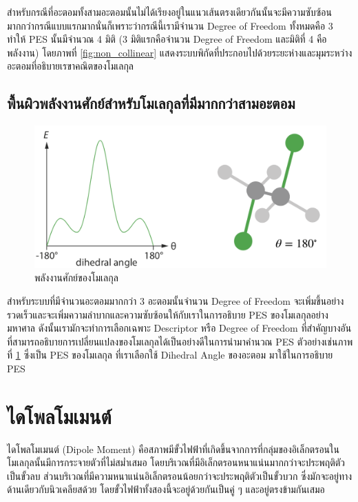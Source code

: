 สำหรับกรณีที่อะตอมทั้งสามอะตอมนั้นไม่ได้เรียงอยู่ในแนวเส้นตรงเดียวกันนั้นจะมีความซับซ้อนมากกว่ากรณีแบบแรกมากนั่นก็เพราะว่ากรณีนี้เรามีจำนวน Degree of Freedom ทั้งหมดคือ 3 ทำให้ PES นั้นมีจำนวณ 4 มิติ (3 มิติแรกคือจำนวน Degree of Freedom และมิติที่ 4 คือพลังงาน) โดยภาพที่ \ref{fig:non_collinear} แสดงระบบพิกัดที่ประกอบไปด้วยระยะห่างและมุมระหว่างอะตอมที่อธิบายเรขาคณิตของโมเลกุล

\subsection{พื้นผิวพลังงานศักย์สำหรับโมเลกุลที่มีมากกว่าสามอะตอม}
\label{ssec:pes_n_atoms}

\begin{figure}[H]
    \centering
    \includegraphics[width=0.7\linewidth]{fig/PES_C2H4Cl2.png}
    \caption{พลังงานศักย์ของโมเลกุล }
    \label{fig:pes_c2h4cl2}
\end{figure}

สำหรับระบบที่มีจำนวนอะตอมมากกว่า 3 อะตอมนั้นจำนวน Degree of Freedom จะเพิ่มขึ้นอย่างรวดเร็วและจะเพิ่มความลำบากและความซับซ้อนให้กับเราในการอธิบาย PES ของโมเลกุลอย่างมหาศาล ดังนั้นเรามักจะทำการเลือกเฉพาะ Descriptor หรือ Degree of Freedom ที่สำคัญบางอันที่สามารถอธิบายการเปลี่ยนแปลงของโมเลกุลได้เป็นอย่างดีในการนำมาคำนวณ PES ตัวอย่างเช่นภาพที่ \ref{fig:pes_c2h4cl2} ซึ่งเป็น PES ของโมเลกุล  ที่เราเลือกใช้ Dihedral Angle ของอะตอม  มาใช้ในการอธิบาย PES

\section{ไดโพลโมเมนต์}
\label{sec:dipole_moment}

ไดโพลโมเมนต์ (Dipole Moment) คือสภาพมีขั้วไฟฟ้าที่เกิดขึ้นจากการที่กลุ่มของอิเล็กตรอนในโมเลกุลนั้นมีการกระจายตัวที่ไม่สมํ่าเสมอ โดยบริเวณที่มีอิเล็กตรอนหนาแน่นมากกว่าจะประพฤติตัวเป็นขั้วลบ ส่วนบริเวณที่มีความหนาแน่นอิเล็กตรอนน้อยกว่าจะประพฤติตัวเป็นขั้วบวก ซึ่งมักจะอยู่ทางด้านเดียวกับนิวเคลียสด้วย โดยขั้วไฟฟ้าทั้งสองนี้จะอยู่ด้วยกันเป็นคู่ ๆ และอยู่ตรงข้ามกันเสมอ


